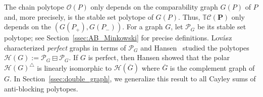 \documentclass[11pt]{amsart}
\theoremstyle{definition}
\begin{document}
The chain polytope ${\mathcal{O}({P})}$ only depends on the comparability graph $G({P})$
of ${P}$ and, more precisely, is the stable set polytope of $G({P})$. Thus,
${{\mathbb{T}}{\mathcal{C}({{{\mathbf{P}}}})}}$ only depends on the {\textbf{\color{black}{double graph}}} $(G({P}_+),G({P}_-))$.
For a graph $G$, let ${\mathcal{P}}_G$ be its stable set polytope; see
Section~\ref{ssec:AB_Minkowski} for precise definitions.
Lov\'{a}sz~\cite{Lovasz} characterized \emph{perfect} graphs in terms of
${\mathcal{P}}_G$ and Hansen~\cite{Hansen} studied the polytopes ${\mathcal{H}({G})} :=
{{{{\mathcal{P}}_G} \boxminus {{\mathcal{P}}_G}}}$. If $G$ is perfect, then Hansen showed that the polar
${\mathcal{H}({G})}^{\triangle}$ is linearly isomorphic to ${\mathcal{H}({\overline{G}})}$ where
$\overline{G}$ is the complement graph of $G$. In
Section~\ref{ssec:double_graph}, we generalize this result to all Cayley sums
of anti-blocking polytopes.
\end{document}
